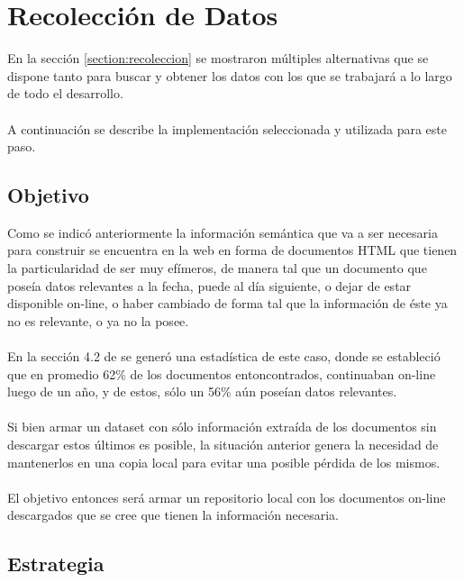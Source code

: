 \chapter{Recolección de Datos}
\label{chapter:recoleccion}

En la sección \ref{section:recoleccion} se mostraron múltiples alternativas que se dispone 
tanto para buscar y obtener los datos con los que se trabajará a lo largo de todo el desarrollo.
\\\\
A continuación se describe la implementación seleccionada y utilizada para este paso.

\section{Objetivo}
\label{section:recoleccion-objetivo}

\noindent Como se indicó anteriormente la información semántica que va a ser necesaria para construir se encuentra en la web en forma de documentos 
HTML que tienen la particularidad de ser muy efímeros, de manera tal que un documento que poseía datos relevantes a la fecha,
puede al día siguiente, o dejar de estar disponible on-line, o haber cambiado de forma tal que la información de éste ya no es 
relevante, o ya no la posee. 
\\\\
En la sección 4.2 de \cite{Mendoza2014} se generó una estadística de este caso, donde se estableció que 
en promedio 62\% de los documentos entoncontrados, continuaban on-line luego de un año, y de estos, sólo un 56\% aún poseían 
datos relevantes. 
\\\\
Si bien armar un dataset con sólo información extraída de los documentos sin descargar estos últimos es posible, la situación anterior 
genera la necesidad de mantenerlos en una copia local para evitar una posible pérdida de los mismos. 
\\\\
El objetivo entonces será armar un repositorio local con los documentos on-line descargados que se cree que tienen la información 
necesaria. 

 
\section{Estrategia}
\label{section:recoleccion-estrategia}

